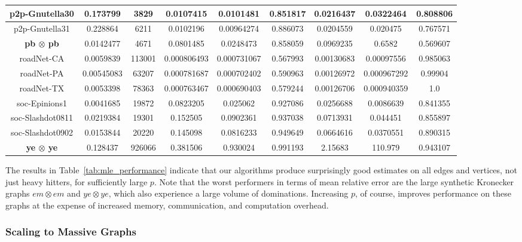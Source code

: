 \documentclass[10]{article}
\begin{document}
\begin{table}
{\begin{tabular}{|c|c|c|c|c|c|c|c|c|}
p2p-Gnutella30&0.173799 & 3829 & 0.0107415 & 0.0101481 & 0.851817 & 0.0216437 & 0.0322464 & 0.808806 \\
\hline
p2p-Gnutella31&0.228864 & 6211 & 0.0102196 & 0.00964274 & 0.886073 & 0.0204559 & 0.020475 & 0.767571 \\
\hline
\textbf{pb $\boldsymbol{\otimes}$ pb}&0.0142477 & 4671 & 0.0801485 & 0.0248473 & 0.858059 & 0.0969235 & 0.6582 & 0.569607 \\
\hline
roadNet-CA&0.0059839 & 113001 & 0.000806493 & 0.000731067 & 0.567993 & 0.00130683 & 0.00097556 & 0.985063 \\
\hline
roadNet-PA&0.00545083 & 63207 & 0.000781687 & 0.000702402 & 0.590963 & 0.00126972 & 0.000967292 & 0.99904 \\
\hline
roadNet-TX&0.0053398 & 78363 & 0.000763467 & 0.000690403 & 0.579244 & 0.00126706 & 0.000940359 & 1.0 \\
\hline
soc-Epinions1&0.0041685 & 19872 & 0.0823205 & 0.025062 & 0.927086 & 0.0256688 & 0.0086639 & 0.841355 \\
\hline
soc-Slashdot0811&0.0219384 & 19301 & 0.152505 & 0.0902361 & 0.937038 & 0.0713931 & 0.044451 & 0.855897 \\
\hline
soc-Slashdot0902&0.0153844 & 20220 & 0.145098 & 0.0816233 & 0.949649 & 0.0664616 & 0.0370551 & 0.890315 \\
\hline
\textbf{ye $\boldsymbol{\otimes}$ ye}&0.128437 & 926066 & 0.381506 & 0.930024 & 0.991193 & 2.15683 & 110.979 & 0.943107 \\
\hline
\end{tabular}}
\end{table}

The results in Table~\ref{tab:mle_performance} indicate that our algorithms produce surprisingly good estimates on all edges and vertices, not just heavy hitters, for sufficiently large $p$. 
Note that the worst performers in terms of mean relative error are the large synthetic Kronecker graphs $em \otimes em$ and $ye \otimes ye$, which also experience a large volume of dominations. 
Increasing $p$, of course, improves performance on these graphs at the expense of increased memory, communication, and computation overhead. 




\subsubsection{Scaling to Massive Graphs}
\end{document}
